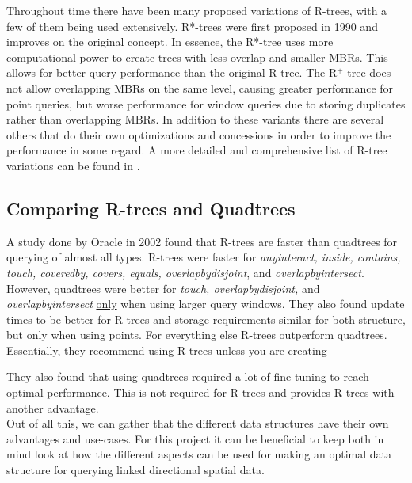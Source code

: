 Throughout time there have been many proposed variations of R-trees, with a few of them being used extensively. R*-trees were first proposed in 1990 and improves on the original concept. In essence, the R*-tree uses more computational power to create trees with less overlap and smaller MBRs. This allows for better query performance than the original R-tree. The R$^+$-tree does not allow overlapping MBRs on the same level, causing greater performance for point queries, but worse performance for window queries due to storing duplicates rather than overlapping MBRs. In addition to these variants there are several others that do their own optimizations and concessions in order to improve the performance in some regard. A more detailed and comprehensive list of R-tree variations can be found in \cite{r_tree_variations}.


\subsection{Comparing R-trees and Quadtrees}
A study done by Oracle in 2002 found that R-trees are faster than quadtrees for querying of almost all types. R-trees were faster for \textit{anyinteract, inside, contains, touch, coveredby, covers, equals, overlapbydisjoint}, and \textit{overlapbyintersect}. However, quadtrees were better for \textit{touch, overlapbydisjoint,} and \textit{overlapbyintersect} \underline{only} when using larger query windows. They also found update times to be better for R-trees and storage requirements similar for both structure, but only when using points. For everything else R-trees outperform quadtrees. Essentially, they recommend using R-trees unless you are creating 
\begin{quote}
	 \cite{oracle_comparison_quad_vs_r}
\end{quote}

They also found that using quadtrees required a lot of fine-tuning to reach optimal performance. This is not required for R-trees and provides R-trees with another advantage. \\

Out of all this, we can gather that the different data structures have their own advantages and use-cases. For this project it can be beneficial to keep both in mind look at how the different aspects can be used for making an optimal data structure for querying linked directional spatial data.

